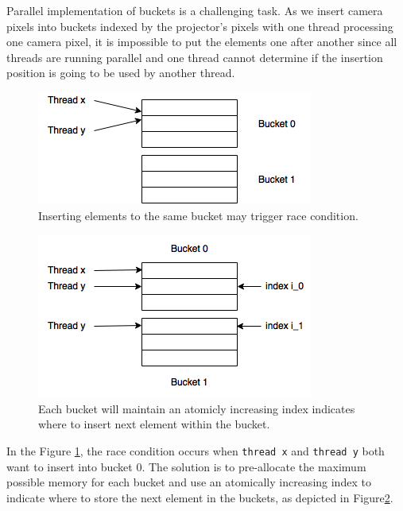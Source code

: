 \documentclass[final,12pt,3p]{elsarticle}
\begin{document}
Parallel implementation of buckets is a challenging task. As we insert camera pixels into buckets indexed by the projector's pixels with one thread processing one camera pixel, it is impossible to put the elements one after another since all threads are running parallel and one thread cannot determine if the insertion position is going to be used by another thread.

\begin{center}
\begin{figure}
    \centering
    \includegraphics{race01.png}
    \caption{Inserting elements to the same bucket may trigger race condition.}
    \label{fig:race01}
\end{figure}
\end{center}

\begin{center}
\begin{figure}
    \centering
    \includegraphics{race02.png}
    \caption{Each bucket will maintain an atomicly increasing index indicates where to insert next element within the bucket.}
    \label{fig:race02}
\end{figure}
\end{center}

In the Figure \ref{fig:race01}, the race condition occurs when \texttt{thread\ x}
and \texttt{thread\ y} both want to insert into bucket 0. The solution is to pre-allocate the maximum possible memory for each bucket and
use an atomically increasing index to indicate where to store the next element in the buckets, as depicted in Figure\ref{fig:race02}.
\end{document}
